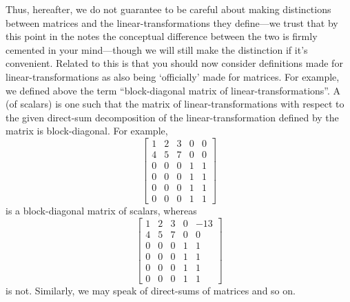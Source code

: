 Thus, hereafter, we do not guarantee to be careful about making distinctions between matrices and the linear-transformations they define---we trust that by this point in the notes the conceptual difference between the two is firmly cemented in your mind---though we will still make the distinction if it's convenient.  Related to this is that you should now consider definitions made for linear-transformations as also being `officially' made for matrices.  For example, we defined above the term ``block-diagonal matrix of linear-transformations''.  A  (of scalars) is one such that the matrix of linear-transformations with respect to the given direct-sum decomposition of the linear-transformation defined by the matrix is block-diagonal.  For example,
\begin{equation}
	\begin{bmatrix}1 & 2 & 3 & 0 & 0 \\ 4 & 5 & 7 & 0 & 0 \\ 0 & 0 & 0 & 1 & 1 \\ 0 & 0 & 0 & 1 & 1 \\ 0 & 0 & 0 & 1 & 1 \\ 0 & 0 & 0 & 1 & 1\end{bmatrix}
\end{equation}
is a block-diagonal matrix of scalars, whereas
\begin{equation}
	\begin{bmatrix}1 & 2 & 3 & 0 & -13 \\ 4 & 5 & 7 & 0 & 0 \\ 0 & 0 & 0 & 1 & 1 \\ 0 & 0 & 0 & 1 & 1 \\ 0 & 0 & 0 & 1 & 1 \\ 0 & 0 & 0 & 1 & 1\end{bmatrix}
\end{equation}
is not.  Similarly, we may speak of direct-sums of matrices and so on.

\horizontalrule

